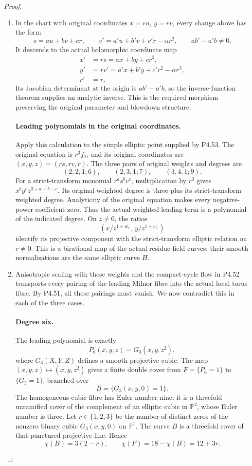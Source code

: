 \begin{proof}
\begin{enumerate}[label={$\langle1\rangle$\arabic*.},leftmargin=*]
\item In the chart with original coordinates
\(x=r u\), \(y=r v\), every change above has the form
\[
 s=a u+b v+c r,\qquad
 v'=a'u+b'v+c'r-\alpha r^2,
 \qquad ab'-a'b\ne0.
\]
It descends to the actual holomorphic coordinate map
\[
 \begin{aligned}
 x'&=r s=a x+b y+c r^2,\\
 y'&=r v'=a'x+b'y+c'r^2-\alpha r^3,\\
 r'&=r.
 \end{aligned}                                        \tag{4.54w.5}
\]
Its Jacobian determinant at the origin is \(ab'-a'b\),
so the inverse-function theorem supplies an analytic inverse.
This is the required morphism preserving the original
parameter and blowdown structure.

\paragraph{Leading polynomials in the original coordinates.}
Apply this calculation to the simple elliptic point supplied
by P4.53. The original equation is $r^3f_1$, and its original
coordinates are $(x,y,z)=(rs,rv,r)$. The three pairs of
original weights and degrees are
\[
 (2,2,1;6),\qquad (2,3,1;7),\qquad (3,4,1;9).
\]
For a strict-transform monomial $r^as^bv^c$, multiplication
by $r^3$ gives $x^by^cz^{3+a-b-c}$. Its original weighted
degree is three plus its strict-transform weighted degree.
Analyticity of the original equation makes every
negative-power coefficient zero. Thus the actual weighted
leading term is a polynomial of the indicated degree.
On $z\ne0$, the ratios
\[
     \left(x/z^{1+w_s},\ y/z^{1+w_v}\right)
\]
identify its projective component with the strict-transform
elliptic relation on $r\ne0$. This is a birational map
of the actual residue-field curves; their smooth
normalizations are the same elliptic curve $H$.

\item Anisotropic scaling with these weights and the compact-cycle
flow in P4.52 transports every pairing of the leading
Milnor fibre into the actual local torus fibre. By P4.51,
all these pairings must vanish. We now contradict this
in each of the three cases.

\paragraph{Degree six.}
The leading polynomial is exactly
\[
                    P_6(x,y,z)=G_3(x,y,z^2),
\]
where $G_3(X,Y,Z)$ defines a smooth projective cubic.
The map $(x,y,z)\mapsto(x,y,z^2)$ gives a finite double
cover from $F=\{P_6=1\}$ to $\{G_3=1\}$, branched over
\[
                       B=\{G_3(x,y,0)=1\}.
\]
The homogeneous cubic fibre has Euler number nine: it
is a threefold unramified cover of the complement of
an elliptic cubic in $\mathbb P^2$, whose Euler number
is three. Let $r\in\{1,2,3\}$ be the number of distinct
zeros of the nonzero binary cubic $G_3(x,y,0)$ on
$\mathbb P^1$. The curve $B$ is a threefold cover of
that punctured projective line. Hence
\[
          \chi(B)=3(2-r),\qquad \chi(F)=18-\chi(B)=12+3r.
\]


\end{enumerate}
\end{proof}
